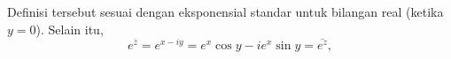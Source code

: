 
Definisi tersebut sesuai dengan eksponensial standar untuk bilangan real (ketika
$y=0$). Selain itu,
\begin{equation*}
e^{\bar{z}} = 
e^{x-iy} =
e^x\cos y - i e^x \sin y  = \overline{e^{z}} ,
\end{equation*}
